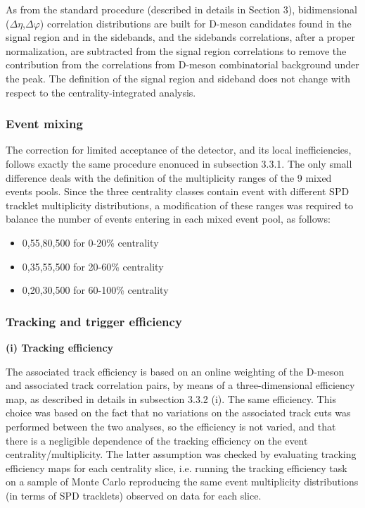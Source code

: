 As from the standard procedure (described in details in Section 3), bidimensional ($\Delta\eta$,$\Delta\varphi$) correlation distributions are built for D-meson candidates found in the signal region and in the sidebands, and the sidebands correlations, after a proper normalization, are subtracted from the signal region correlations to remove the contribution from the correlations from D-meson combinatorial background under the peak. The definition of the signal region and sideband does not change with respect to the centrality-integrated analysis.

\subsubsection{Event mixing}
The correction for limited acceptance of the detector, and its local inefficiencies, follows exactly the same procedure enonuced in subsection 3.3.1.
The only small difference deals with the definition of the multiplicity ranges of the 9 mixed events pools. Since the three centrality classes contain event with different SPD tracklet multiplicity distributions, a modification of these ranges was required to balance the number of events entering in each mixed event pool, as follows:
\begin{itemize}
  \item {0,55,80,500} for 0-20\% centrality
  \item {0,35,55,500} for 20-60\% centrality
  \item {0,20,30,500} for 60-100\% centrality
\end{itemize}

\subsubsection{Tracking and trigger efficiency}

{\bf (i) Tracking efficiency}

The associated track efficiency is based on an online weighting of the D-meson and associated track correlation pairs, by means of a three-dimensional efficiency map, as described in details in subsection 3.3.2 (i).
The same efficiency.
This choice was based on the fact that no variations on the associated track cuts was performed between the two analyses, so the efficiency is not varied, and that there is a negligible dependence of the tracking efficiency on the event centrality/multiplicity.
The latter assumption was checked by evaluating tracking efficiency maps for each centrality slice, i.e. running the tracking efficiency task on a sample of Monte Carlo reproducing the same event multiplicity distributions (in terms of SPD tracklets) observed on data for each slice.

